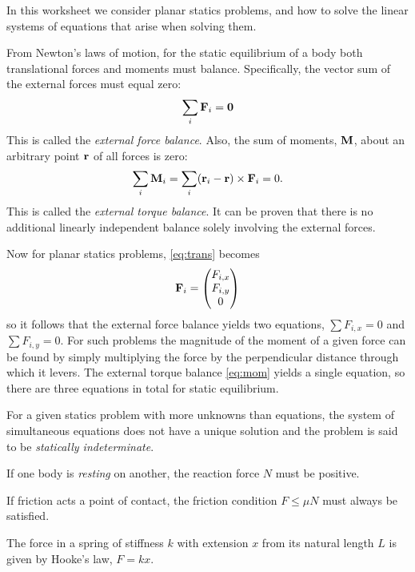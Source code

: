 In this worksheet we consider planar statics problems, and how to solve the linear systems of equations that arise when solving them.

From Newton's laws of motion, for the static equilibrium of a body both translational forces and moments must balance. Specifically, the vector sum of the external forces must equal zero:
\begin{equation} \label{eq:trans}
 \sum_{i} {\bf F}_{i}= \bf{0}
\end{equation}
This is called the {\em external force balance}. Also, the sum of moments, $\bf{M}$, about an arbitrary point ${\bf r}$ of all forces is zero:
\begin{equation} \label{eq:mom}
 \sum_{i} {\bf M}_{i}= \sum_{i} ({\bf r}_{i}-{\bf r}) \times {\bf F}_{i}= 0.
\end{equation}
This is called the {\em external torque balance}. It can be proven that there is no additional linearly independent balance solely involving the external forces.

Now for planar statics problems, \eqref{eq:trans} becomes
\[
 {\bf F}_{i}=\begin{pmatrix}
         F_{i,x} \\ F_{i,y} \\ 0
        \end{pmatrix}
\]
so it follows that the external force balance yields two equations, $\sum F_{i,x} =0$ and $\sum F_{i,y}=0$. For such problems the magnitude of the moment of a given force can be found by simply multiplying the force by the perpendicular distance through which it levers. The external torque balance \eqref{eq:mom} yields a single equation, so there are three equations in total for static equilibrium.

For a given statics problem with more unknowns than equations, the system of simultaneous equations does not have a unique solution and the problem is said to be {\em statically indeterminate}.

If one body is {\em resting} on another, the reaction force $N$ must be positive.

If friction acts a point of contact, the friction condition $F\leq \mu N$ must always be satisfied.

The force in a spring of stiffness $k$ with extension $x$ from its natural length $L$ is given by Hooke's law, $F=kx$.

